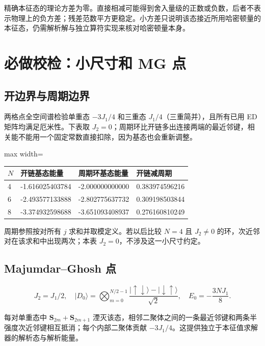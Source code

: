 \documentclass[zihao=5,a4paper]{ctexart}
\begin{document}
精确本征态的理论方差为零。直接相减可能得到舍入量级的正数或负数，后者不表示物理上的负方差；残差范数平方更稳定。小方差只说明该态接近所用哈密顿量的本征态，仍需解析解与独立算符实现来核对哈密顿量本身。


\section{必做校检：小尺寸和 MG 点}

\subsection{\texorpdfstring{开边界与周期边界}{开边界与周期边界}}

两格点全空间谱检验单重态 $-3J_1/4$ 和三重态 $J_1/4$（三重简并），且所有已用 ED 矩阵均满足厄米性。下表取 $J_2=0$；周期环比开链多出连接两端的最近邻键，相关能不能用一个固定常数直接扣除，因为基态也会重新调整。


\begin{center}
\small
\begin{adjustbox}{max width=\linewidth}
\begin{tabular}{llll}
\toprule
$N$ & 开链基态能量 & 周期环基态能量 & 开链减周期 \\
\midrule
4 & -1.616025403784 & -2.000000000000 & 0.383974596216 \\
6 & -2.493577133888 & -2.802775637732 & 0.309198503844 \\
8 & -3.374932598688 & -3.651093408937 & 0.276160810249 \\
\bottomrule
\end{tabular}
\end{adjustbox}
\end{center}

周期参照按对所有 $j$ 求和并取模定义。若以后比较 $N=4$ 且 $J_2\ne0$ 的环，次近邻对在该求和中出现两次；本表 $J_2=0$，不涉及这一小尺寸约定。


\subsection{\texorpdfstring{Majumdar–Ghosh 点}{Majumdar–Ghosh 点}}

\[
J_2=J_1/2,\quad |D_0\rangle=\bigotimes_{m=0}^{N/2-1}\frac{|\uparrow\downarrow\rangle-|\downarrow\uparrow\rangle}{\sqrt2},\quad E_0=-\frac{3N J_1}{8}.
\]

每对单重态中 $\mathbf S_{2m}+\mathbf S_{2m+1}$ 湮灭该态，相邻二聚体之间的一条最近邻键和两条半强度次近邻键相互抵消；每个内部二聚体贡献 $-3J_1/4$。这提供独立于本征值求解器的解析态与解析能量。
\end{document}
